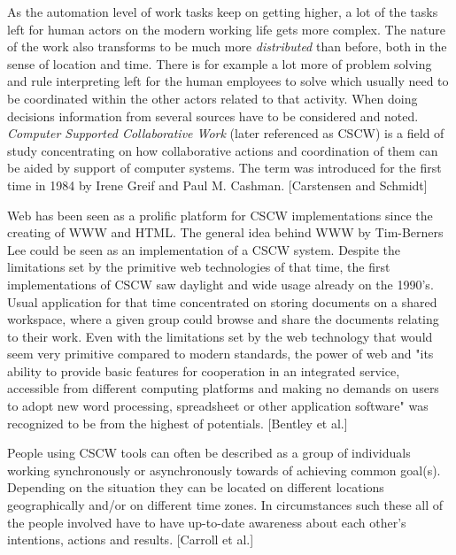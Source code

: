 As the automation level of work tasks keep on getting higher, a lot of the tasks left for human actors on the modern working life gets more complex. The nature of the work also transforms to be much more \textit{distributed} than before, both in the sense of location and time. There is for example a lot more of problem solving and rule interpreting left for the human employees to solve which usually need to be coordinated within the other actors related to that activity. When doing decisions information from several sources have to be considered and noted. \textit{Computer Supported Collaborative Work} (later referenced as CSCW) is a field of study concentrating on how collaborative actions and coordination of them can be aided by support of computer systems. The term was introduced for the first time in 1984 by Irene Greif and Paul M. Cashman. [Carstensen and Schmidt]

Web has been seen as a prolific platform for CSCW implementations since the creating of WWW and HTML. The general idea behind WWW by Tim-Berners Lee could be seen as an implementation of a CSCW system. Despite the limitations set by the primitive web technologies of that time, the first implementations of CSCW saw daylight and wide usage already on the 1990's. Usual application for that time concentrated on storing documents on a shared workspace, where a given group could browse and share the documents relating to their work. Even with the limitations set by the web technology that would seem very primitive compared to modern standards, the power of web and "its ability to provide basic features for cooperation in an integrated service, accessible from different computing platforms and making no demands on users to adopt new word processing, spreadsheet or other application software" was recognized to be from the highest of potentials. [Bentley et al.]

People using CSCW tools can often be described as a group of individuals working synchronously or asynchronously towards of achieving common goal(s). Depending on the situation they can be located on different locations geographically and/or on different time zones. In circumstances such these all of the people involved have to have up-to-date awareness about each other's intentions, actions and results. [Carroll et al.] 

